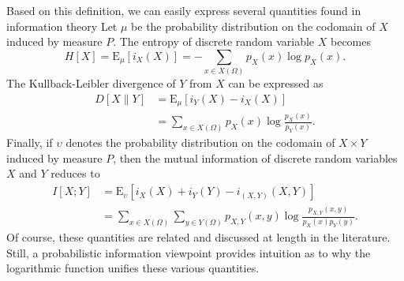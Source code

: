 Based on this definition, we can easily express several quantities found in information theory
Let $\mu$ be the probability distribution on the codomain of $X$ induced by measure $P$.
The entropy of discrete random variable $X$ becomes
\begin{equation*}
H [X] = \mathrm{E}_{\mu} \left[ i_X (X) \right] = - \sum_{x \in X(\Omega)} p_X (x) \log p_X (x) .
\end{equation*}
The Kullback-Leibler divergence of $Y$ from $X$ can be expressed as
\begin{equation*}
\begin{split}
D [X \| Y] &= \mathrm{E}_{\mu} \left[ i_Y (X) - i_X (X) \right] \\
&= \sum_{x \in X(\Omega)} p_X (x) \log \frac{p_X (x)}{p_Y (x)} .
\end{split}
\end{equation*}
Finally, if $\upsilon$ denotes the probability distribution on the codomain of $X \times Y$ induced by measure $P$, then the mutual information of discrete random variables $X$ and $Y$ reduces to
\begin{equation*}
\begin{split}
I [X ; Y] &= \mathrm{E}_{\upsilon} \left[ i_X (X) + i_Y (Y) - i_{(X,Y)} (X,Y) \right] \\
&= \sum_{x \in X(\Omega)} \sum_{y \in Y(\Omega)}
p_{X,Y} (x, y) \log \frac{p_{X,Y} (x, y)}{p_X (x) p_Y (y)} .
\end{split}
\end{equation*}
Of course, these quantities are related and discussed at length in the literature.
Still, a probabilistic information viewpoint provides intuition as to why the logarithmic function unifies these various quantities.
